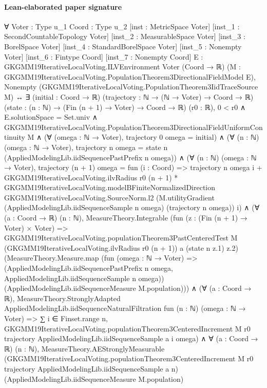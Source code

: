 \documentclass[10pt]{article}
\begin{document}
\paragraph{Lean-elaborated paper signature}
\begin{ReviewVerbatim}
∀ {Voter : Type u_1} {Coord : Type u_2} [inst : MetricSpace Voter] [inst_1 : SecondCountableTopology Voter]
  [inst_2 : MeasurableSpace Voter] [inst_3 : BorelSpace Voter] [inst_4 : StandardBorelSpace Voter]
  [inst_5 : Nonempty Voter] [inst_6 : Fintype Coord] [inst_7 : Nonempty Coord]
  {E : GKGMM19IterativeLocalVoting.ILVEnvironment Voter (Coord → ℝ)}
  (M : GKGMM19IterativeLocalVoting.PopulationTheorem3DirectionalFieldModel E),
  Nonempty (GKGMM19IterativeLocalVoting.PopulationTheorem3IidTraceSource M) ↔
    ∃ (initial : Coord → ℝ) (trajectory : ℕ → (ℕ → Voter) → Coord → ℝ) (state :
      (n : ℕ) → (Fin (n + 1) → Voter) → Coord → ℝ) (r0 : ℝ),
      0 < r0 ∧
        E.solutionSpace = Set.univ ∧
          GKGMM19IterativeLocalVoting.PopulationTheorem3DirectionalFieldUniformContinuity M ∧
            (∀ (omega : ℕ → Voter), trajectory 0 omega = initial) ∧
              (∀ (n : ℕ) (omega : ℕ → Voter),
                  trajectory n omega = state n (AppliedModelingLib.iidSequencePastPrefix n omega)) ∧
                (∀ (n : ℕ) (omega : ℕ → Voter),
                    trajectory (n + 1) omega = fun (i : Coord) =>
                      trajectory n omega i +
                        GKGMM19IterativeLocalVoting.ilvRadius r0 (n + 1) *
                          GKGMM19IterativeLocalVoting.modelBFiniteNormalizedDirection
                            GKGMM19IterativeLocalVoting.SourceNorm.l2
                            (M.utilityGradient (AppliedModelingLib.iidSequenceSample n omega) (trajectory n omega)) i) ∧
                  (∀ (a : Coord → ℝ) (n : ℕ),
                      MeasureTheory.Integrable
                        (fun (z : (Fin (n + 1) → Voter) × Voter) =>
                          GKGMM19IterativeLocalVoting.populationTheorem3PastCenteredTest M
                            (GKGMM19IterativeLocalVoting.ilvRadius r0 (n + 1)) a (state n z.1) z.2)
                        (MeasureTheory.Measure.map
                          (fun (omega : ℕ → Voter) =>
                            (AppliedModelingLib.iidSequencePastPrefix n omega,
                              AppliedModelingLib.iidSequenceSample n omega))
                          (AppliedModelingLib.iidSequenceMeasure M.population))) ∧
                    (∀ (a : Coord → ℝ),
                        MeasureTheory.StronglyAdapted AppliedModelingLib.iidSequenceNaturalFiltration
                          fun (n : ℕ) (omega : ℕ → Voter) =>
                          ∑ i ∈ Finset.range n,
                            GKGMM19IterativeLocalVoting.populationTheorem3CenteredIncrement M r0 trajectory
                              AppliedModelingLib.iidSequenceSample a i omega) ∧
                      ∀ (a : Coord → ℝ) (n : ℕ),
                        MeasureTheory.AEStronglyMeasurable
                          (GKGMM19IterativeLocalVoting.populationTheorem3CenteredIncrement M r0 trajectory
                            AppliedModelingLib.iidSequenceSample a n)
                          (AppliedModelingLib.iidSequenceMeasure M.population)
\end{ReviewVerbatim}
\end{document}
